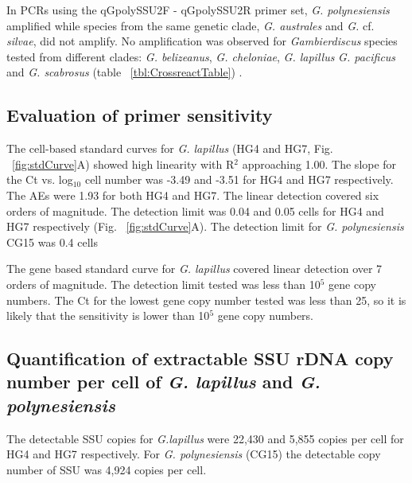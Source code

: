 \documentclass[12pt]{article}
\begin{document}
In PCRs using the qGpolySSU2F - qGpolySSU2R primer set, \emph{G. polynesiensis} amplified while species from the same genetic clade, \emph{G. australes} and \emph{G.} cf. \emph{silvae}, did not amplify. No amplification was observed for \emph{Gambierdiscus} species tested from different clades: \emph{G. belizeanus}, \emph{G. cheloniae}, \emph{G. lapillus }\emph{G. pacificus} and \emph{G. scabrosus} (table ~\ref{tbl:CrossreactTable}) \citep{kretzschmar2016characterization}.


 
\subsection*{Evaluation of primer sensitivity}
The cell-based standard curves for \emph{G. lapillus} (HG4 and HG7, Fig. ~\ref{fig:stdCurve}A) showed high linearity with R$^{2}$ approaching 1.00. The slope for the Ct vs. log$_{10}$ cell number was -3.49 and -3.51 for HG4 and HG7 respectively. The AEs were 1.93 for both HG4 and HG7. The linear detection covered six orders of magnitude. The detection limit was 0.04 and 0.05 cells for HG4 and HG7 respectively (Fig. ~\ref{fig:stdCurve}A).
The detection limit for \emph{G. polynesiensis} CG15 was 0.4 cells



The gene based standard curve for \emph{G. lapillus} covered linear detection over 7 orders of magnitude. The detection limit tested was less than 10$^{5}$ gene copy numbers. The Ct for the lowest gene copy number tested was less than 25, so it is likely that the sensitivity is lower than 10$^{5}$ gene copy numbers.



\subsection*{Quantification of extractable SSU rDNA copy number per cell of \emph{G. lapillus} and \emph{G. polynesiensis}}
The detectable SSU copies for \emph{G.lapillus} were 22,430 and 5,855 copies per cell for HG4 and HG7 respectively. For \emph{G. polynesiensis} (CG15) the detectable copy number of SSU was 4,924 copies per cell.
\end{document}
